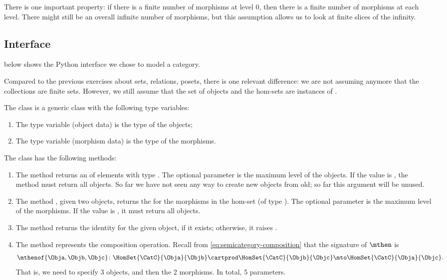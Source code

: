 There is one important property: if there is a finite number of morphisms at level 0, then there is a finite number of morphisms at each level.
There might still be an overall infinite number of morphisms, but this assumption allows us to look at finite slices of the infinity.

\vfill\pagebreak

\subsection{Interface}

 below shows the Python interface we chose to model a category.

Compared to the previous exercises about sets, relations, posets, there is one relevant difference:
we are not assuming anymore that the collections are finite sets.
However, we still assume that the set of objects and the hom-sets are instances of \EnumerableSet.

The class \SemiCategory is a generic class with the following type variables:
\begin{enumerate}
    \item The type variable  (object data) is the type of the objects;
    \item The type variable  (morphism data) is the type of the morphisms.
\end{enumerate}

The class \SemiCategory has the following methods:
\begin{enumerate}
    \item The method  returns an \EnumerableSet of elements with type .
          The optional parameter is the maximum level of the objects.
          If the value is , the method must return all objects.
          So far we have not seen any way to create new objects from old; so far this argument will be unused.
    \item The method , given two objects, returns the \EnumerableSet for the morphisms in the hom-set (of type ).
          The optional parameter is the maximum level of the morphisms.
          If the value is ,  it must return all objects.
    \item The method  returns the identity for the given object, if it exists; otherwise, it raises .
    \item The method  represents the composition operation.
          Recall from \cref{eq:semicategory-composition} that the signature of $\mthen$ is
          \begin{equation}
              \mthenof{\Obja,\Objb,\Objc}\colon \HomSet{\CatC}{\Obja}{\Objb} \cartprod \HomSet{\CatC}{\Objb}{\Objc}\mto \HomSet{\CatC}{\Obja}{\Objc}.
          \end{equation}
          That is, we need to specify 3 objects, and then the 2 morphisms.
          In total, 5 parameters.
\end{enumerate}

